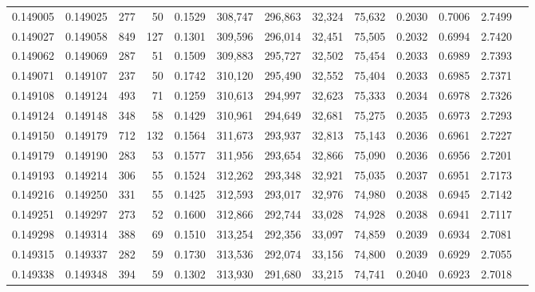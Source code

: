 \begin{tabular}{rrrrrrrrrrrrr}
0.149005 & 0.149025 &   277 &  50 &                                     0.1529 & 308,747 & 296,863 &  32,324 &  75,632 & 0.2030 & 0.7006 & 2.7499 \\
0.149027 & 0.149058 &   849 & 127 &                                     0.1301 & 309,596 & 296,014 &  32,451 &  75,505 & 0.2032 & 0.6994 & 2.7420 \\
0.149062 & 0.149069 &   287 &  51 &                                     0.1509 & 309,883 & 295,727 &  32,502 &  75,454 & 0.2033 & 0.6989 & 2.7393 \\
0.149071 & 0.149107 &   237 &  50 &                                     0.1742 & 310,120 & 295,490 &  32,552 &  75,404 & 0.2033 & 0.6985 & 2.7371 \\
0.149108 & 0.149124 &   493 &  71 &                                     0.1259 & 310,613 & 294,997 &  32,623 &  75,333 & 0.2034 & 0.6978 & 2.7326 \\
0.149124 & 0.149148 &   348 &  58 &                                     0.1429 & 310,961 & 294,649 &  32,681 &  75,275 & 0.2035 & 0.6973 & 2.7293 \\
0.149150 & 0.149179 &   712 & 132 &                                     0.1564 & 311,673 & 293,937 &  32,813 &  75,143 & 0.2036 & 0.6961 & 2.7227 \\
0.149179 & 0.149190 &   283 &  53 &                                     0.1577 & 311,956 & 293,654 &  32,866 &  75,090 & 0.2036 & 0.6956 & 2.7201 \\
0.149193 & 0.149214 &   306 &  55 &                                     0.1524 & 312,262 & 293,348 &  32,921 &  75,035 & 0.2037 & 0.6951 & 2.7173 \\
0.149216 & 0.149250 &   331 &  55 &                                     0.1425 & 312,593 & 293,017 &  32,976 &  74,980 & 0.2038 & 0.6945 & 2.7142 \\
0.149251 & 0.149297 &   273 &  52 &                                     0.1600 & 312,866 & 292,744 &  33,028 &  74,928 & 0.2038 & 0.6941 & 2.7117 \\
0.149298 & 0.149314 &   388 &  69 &                                     0.1510 & 313,254 & 292,356 &  33,097 &  74,859 & 0.2039 & 0.6934 & 2.7081 \\
0.149315 & 0.149337 &   282 &  59 &                                     0.1730 & 313,536 & 292,074 &  33,156 &  74,800 & 0.2039 & 0.6929 & 2.7055 \\
0.149338 & 0.149348 &   394 &  59 &                                     0.1302 & 313,930 & 291,680 &  33,215 &  74,741 & 0.2040 & 0.6923 & 2.7018 \\

\end{tabular}
